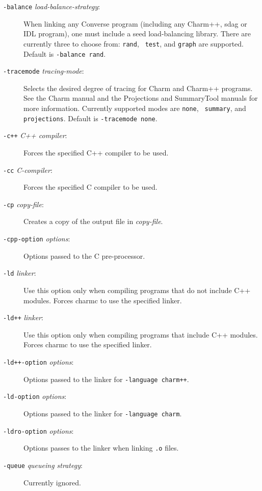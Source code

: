 \begin{description}
\item[{\tt -balance} {\em load-balance-strategy}:]

When linking any Converse program (including any Charm++, sdag or IDL program),
one must include a seed load-balancing
library.  There are currently three to choose from: {\tt rand}, {\tt
test}, and {\tt graph} are supported.  Default is {\tt -balance rand}.

\item[{\tt -tracemode} {\em tracing-mode}:]

Selects the desired degree of tracing for Charm and Charm++ programs.
See the Charm manual and the Projections and SummaryTool manuals for
more information.  Currently supported modes are {\tt none}, {\tt
summary}, and {\tt projections}. Default is {\tt -tracemode none}.


\item[{\tt -c++} {\em C++ compiler}:]

Forces the specified C++ compiler to be used.

\item[{\tt -cc} {\em C-compiler}:]

Forces the specified C compiler to be used.

\item[{\tt -cp} {\em copy-file}:]

Creates a copy of the output file in {\em copy-file}.

\item[{\tt -cpp-option} {\em options}:]

Options passed to the C pre-processor.

\item[{\tt -ld} {\em linker}:]

Use this option only when compiling programs that do not include C++
modules.  Forces charmc to use the specified linker.

\item[{\tt -ld++} {\em linker}:]

Use this option only when compiling programs that include C++
modules.  Forces charmc to use the specified linker.

\item[{\tt -ld++-option} {\em options}:]

Options passed to the linker for {\tt -language charm++}.

\item[{\tt -ld-option} {\em options}:]

Options passed to the linker for {\tt -language charm}.

\item[{\tt -ldro-option} {\em options}:]

Options passes to the linker when linking {\tt .o} files.

\item[{\tt -queue} {\em queueing strategy}:]

Currently ignored.

\end{description}
